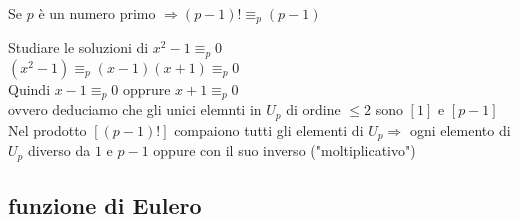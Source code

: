 \documentclass[12px]{article}
\begin{document}
{\begin{itemize}
		 \end{itemize}
		 \begin{teo}
		 	Se $p$ è un numero primo $  \Rightarrow (p-1)! \equiv_p (p-1)$\\
		 \end{teo}
\begin{dimo}
	Studiare le soluzioni di $x^2 - 1 \equiv_p 0$\\
	$(x^2-1)\equiv_p (x-1)(x+1)\equiv_p 0$\\
	Quindi $x-1\equiv_p 0$ opprure  $x + 1\equiv_p 0$\\
	ovvero deduciamo che gli unici elemnti in  $U_p$ di ordine $\leq 2 $ sono $[1]$ e $[p-1]$\\
	Nel prodotto  $[(p-1)!]$ compaiono tutti gli elementi di $U_p \Rightarrow $   ogni elemento di $U_p$ diverso da  $1$ e $p-1$ oppure con il suo inverso ("moltiplicativo")
\end{dimo}
\subsection{funzione di Eulero}



}
\end{document}
